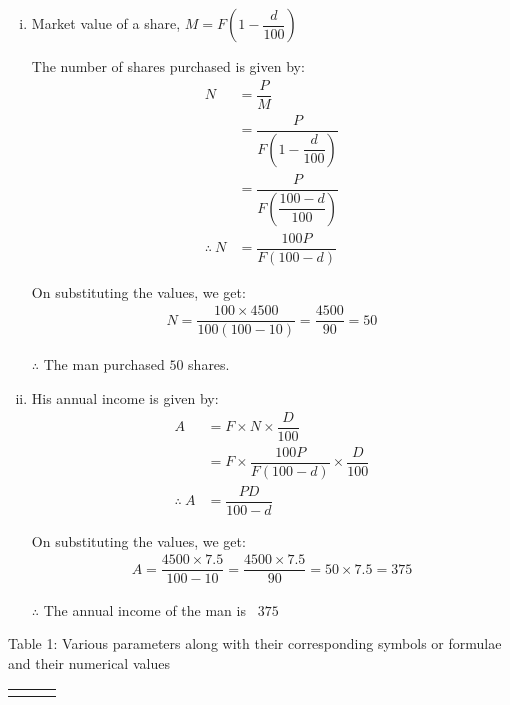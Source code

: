 \documentclass[journal,12pt,twocolumn]{IEEEtran}
\begin{document}
	\begin{enumerate}[(i)]
		\item Market value of a share, $M = F \left(1 - \dfrac{d}{100} \right)$
		\vspace*{5pt}
		
		The number of shares purchased is given by: 		
		\begin{align*}
			N &= \dfrac{P}{M} \\ 
			&= \dfrac{P}{F \left(1 - \dfrac{d}{100} \right)} \\
			&= \dfrac{P}{F \left(\dfrac{100 - d}{100} \right)} \\
 			\therefore~N &= \dfrac{100P}{F(100-d)}
		\end{align*}
		
		On substituting the values, we get:
		\begin{align*}
			N = \dfrac{100 \times 4500}{100(100 - 10)} = \dfrac{4500}{90} = 50
		\end{align*}
		
		$\therefore$ The man purchased $50$ shares.
		
		\vspace*{10pt}
		\item His annual income is given by:
		\begin{align*}
		 	A &= F \times N \times \dfrac{D}{100} \\ 
		 	&= F \times \dfrac{100P}{F(100-d)} \times \dfrac{D}{100} \\ 
		 	\therefore~A &= \dfrac{PD}{100-d}
		 \end{align*}
		 
		 On substituting the values, we get:
		\begin{align*}
			A = \dfrac{4500 \times 7.5}{100 - 10} = \dfrac{4500 \times 7.5}{90} = 50 \times 7.5 = 375
		\end{align*}
		
		$\therefore$ The annual income of the man is \rupee~$375$		
		
	\end{enumerate}
	
	\vspace*{20pt}	
	
	\begin{center}
		Table 1: Various parameters along with their corresponding symbols or formulae and their numerical values
	\end{center}	
		
	\begin{center}
		\begin{tabular}{|l|c|c|} 
  			\mytable
		\end{tabular}
	\end{center}
		
\end{document}
